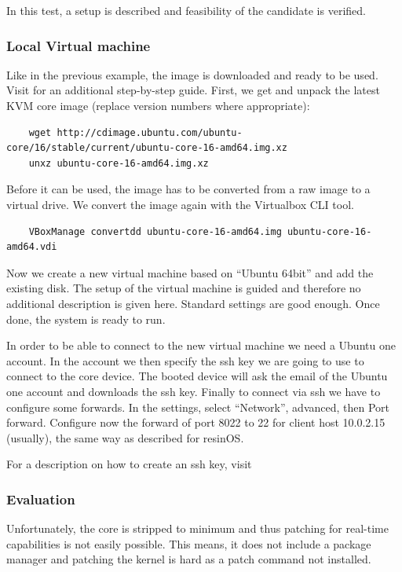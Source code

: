 \documentclass[]{scrartcl}
\begin{document}
In this test, a setup is described and feasibility of the candidate is verified.

\subsubsection{Local Virtual machine}

Like in the previous example, the image is downloaded and ready to be used. Visit \cite{ubuntu01} for an additional step-by-step guide.
First, we get and unpack the latest KVM core image (replace version numbers where appropriate):

\begin{verbatim}
	wget http://cdimage.ubuntu.com/ubuntu-core/16/stable/current/ubuntu-core-16-amd64.img.xz
	unxz ubuntu-core-16-amd64.img.xz
\end{verbatim}

Before it can be used, the image has to be converted from a raw image to a virtual drive. We convert the image again with the Virtualbox CLI tool.

\begin{verbatim}
	VBoxManage convertdd ubuntu-core-16-amd64.img ubuntu-core-16-amd64.vdi
\end{verbatim}

Now we create a new virtual machine based on ``Ubuntu 64bit'' and add the existing disk. The setup of the virtual machine is guided and therefore no additional description is given here. Standard settings are good enough. Once done, the system is ready to run.

In order to be able to connect to the new virtual machine we need a Ubuntu one account. In the account we then specify the ssh key we are going to use to connect to the core device. The booted device will ask the email of the Ubuntu one account and downloads the ssh key. Finally to connect via ssh we have to configure some forwards. In the settings, select ``Network'', advanced, then Port forward. Configure now the forward of port 8022 to 22 for client host 10.0.2.15 (usually), the same way as described for resinOS.

For a description on how to create an ssh key, visit \cite{atlassian01}

\subsubsection{Evaluation}

Unfortunately, the core is stripped to minimum and thus patching for real-time capabilities is not easily possible. This means, it does not include a package manager and patching the kernel is hard as a patch command not installed.
\end{document}
